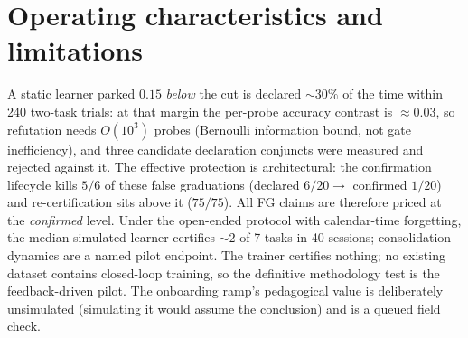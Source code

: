 \documentclass[11pt]{article}
\begin{document}
\section{Operating characteristics and limitations}
A static learner parked $0.15$ \emph{below} the cut is declared ${\sim}30\%$ of
the time within 240 two-task trials: at that margin the per-probe accuracy
contrast is ${\approx}0.03$, so refutation needs $O(10^3)$ probes (Bernoulli
information bound, not gate inefficiency), and three candidate declaration
conjuncts were measured and rejected against it. The effective protection is
architectural: the confirmation lifecycle kills $5/6$ of these false
graduations (declared $6/20 \to$ confirmed $1/20$) and re-certification sits
above it ($75/75$). All FG claims are therefore priced at the \emph{confirmed}
level. Under the open-ended protocol with calendar-time forgetting, the median
simulated learner certifies ${\sim}2$ of 7 tasks in 40 sessions; consolidation
dynamics are a named pilot endpoint. The trainer certifies nothing; no existing
dataset contains closed-loop training, so the definitive methodology test is
the feedback-driven pilot. The onboarding ramp's pedagogical value is
deliberately unsimulated (simulating it would assume the conclusion) and is a
queued field check.
\end{document}
